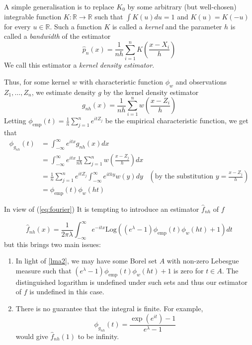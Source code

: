 \documentclass[a4paper,11pt]{article}
\theoremstyle{theorem}
\theoremstyle{definition}
\begin{document}
A simple generalisation is to replace $K_{0}$ by some arbitrary (but well-chosen) integrable function $K : \mathbb{R} \to \mathbb{R}$ such that $\int{K(u)}du = 1$ and $K(u) = K(-u)$ for every $u \in \mathbb{R}$. Such a function $K$ is called a \textit{kernel} and the parameter $h$ is called a \textit{bandwidth} of the estimator
\begin{equation} \label{kde}
\hat{p}_{n}(x) = \frac{1}{nh}\sum_{i=1}^{n}{K\left(\frac{x - X_{i}}{h}\right)}
\end{equation}
We call this estimator a \textit{kernel density estimator}.

Thus, for some kernel $w$ with characteristic function $\phi_{w}$ and observations $Z_{1}, \dotsc , Z_{n}$, we estimate density $g$ by the kernel density estimator
\[
g_{nh}(x) = \frac{1}{nh}\sum_{i=1}^{n}{w\left(\frac{x - Z_{i}}{h}\right)}
\]
Letting $\phi_{\text{emp}}(t) = \frac{1}{n}\sum_{j=1}^{n}{e^{itZ_{j}}}$ be the empirical characteristic function, we get that
\begin{align*}
\phi_{g_{nh}}(t) &= \int_{-\infty}^{\infty}{e^{itx}g_{nh}(x)}dx \\
                 &= \int_{-\infty}^{\infty}{e^{itx}\frac{1}{nh}\sum_{j=1}^{n}{w\left(\frac{x - Z_{j}}{h}\right)}}dx \\
                 &= \frac{1}{n}\sum_{j=1}^{n}{e^{itZ_{j}}}\int_{-\infty}^{\infty}{e^{ithy}w(y)}dy &\left(\text{by the substitution } y = \frac{x - Z_{j}}{h} \right) \\
                 &= \phi_{\text{emp}}(t)\phi_{w}(ht)
\end{align*}

In view of (\ref{eq:fourier}) It is tempting to introduce an estimator $\hat{f}_{nh}$ of $f$

\begin{equation} \label{fnh}
\hat{f}_{nh}(x)= \frac{1}{2\pi\lambda}\int_{-\infty}^{\infty}{e^{-itx}\text{Log}\left((e^{\lambda} - 1)\phi_{\text{emp}}(t)\phi_{w}(ht) + 1\right)}dt
\end{equation}
but this brings two main issues:
\begin{enumerate}
\item In light of \cref{lma2}, we may have some Borel set $A$ with non-zero Lebesgue measure such that $(e^{\lambda} - 1)\phi_{\text{emp}}(t)\phi_{w}(ht) + 1$ is zero for $ t \in A$. The distinguished logarithm is undefined under such sets and thus our estimator of $f$ is undefined in this case.
\item There is no guarantee that the integral is finite. For example,
\[
\phi_{g_{nh}}(t) = \frac{\exp(e^{it}) - 1}{e^{\lambda} - 1}
\]
would give $\hat{f}_{nh}(1)$ to be infinity.
\end{enumerate}
\end{document}
